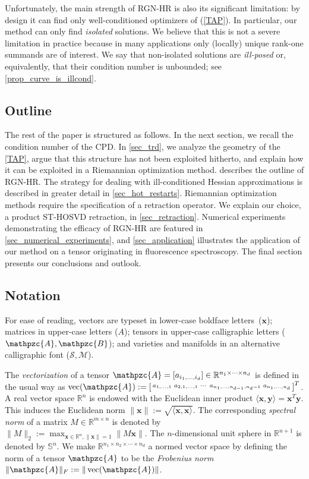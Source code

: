 \documentclass[a4paper,10pt,final]{siamart1116}
\newcommand{\Var}[1]{\mathcal{#1}}
\newcommand{\tensor}[1]{\mathpzc{#1}}
\newcommand{\vect}[1]{\mathbf{#1}}
\newcommand{\R}{\mathbb{R}}
\newcommand{\reftag}[1]{\ref{#1}}
\newcommand{\refeqn}[1]{{(\ref{#1})}}
\newcommand{\refsec}[1]{{\cref{#1}}}
\newcommand{\refprop}[1]{{\cref{#1}}}
\numberwithin{equation}{section}
\numberwithin{figure}{section}
\numberwithin{table}{section}
\numberwithin{theorem}{section}
\begin{document}
Unfortunately, the main strength of RGN-HR is also its significant limitation: by design it can find only well-conditioned optimizers of \refeqn{TAP}. In particular, our method can only find \emph{isolated} solutions. We believe that this is not a severe limitation in practice because in many applications only (locally) unique rank-one summands are of interest. We say that non-isolated solutions are \emph{ill-posed} or, equivalently, that their condition number is unbounded; {see} \refprop{prop_curve_is_illcond}.

\subsection{Outline}
The rest of the paper is structured as follows. In the next section, we recall the condition number of the CPD.
In \refsec{sec_trd}, we analyze the geometry of the \reftag{TAP}, argue that this structure has not been exploited hitherto, and explain how it can be exploited in a Riemannian optimization method.  describes the outline of RGN-HR. The strategy {for dealing with ill-conditioned Hessian approximations} is described in greater detail in \cref{sec_hot_restarts}. Riemannian optimization methods require the specification of a retraction operator. We explain our choice, a product ST-HOSVD retraction, in \cref{sec_retraction}. Numerical experiments demonstrating the efficacy of RGN-HR are featured in \refsec{sec_numerical_experiments}, and \cref{sec_application} illustrates the application of our method on a tensor originating in fluorescence spectroscopy. The final section presents our conclusions and outlook.

\subsection{Notation}
For ease of reading, vectors are typeset in lower-case boldface letters~($\vect{x}$); matrices in upper-case letters ($A$); tensors in upper-case calligraphic letters ($\tensor{A}, \tensor{B}$); and varieties and manifolds in an alternative calligraphic font ($\Var{S}, \Var{M}$).

The \emph{vectorization} of a tensor $\tensor{A} = [a_{i_1,\ldots,i_d}] \in \R^{n_1 \times \cdots \times n_d}$ is defined in the usual way as $\operatorname{vec}(\tensor{A}) := \left[\begin{smallmatrix} a_{1,\ldots,1} & a_{2,1,\ldots,1} & \cdots & a_{n_1,\ldots,n_{d-1},n_d-1} & a_{n_1,\ldots,n_d} \end{smallmatrix}\right]^T$.
A real vector space $\R^n$ is endowed with the Euclidean inner product $\langle \vect{x}, \vect{y} \rangle = \vect{x}^T \vect{y}$. This induces the Euclidean norm $\lVert \vect{x} \rVert := \sqrt{\langle \vect{x}, \vect{x} \rangle}$.
The corresponding \emph{spectral norm} of a matrix $M\in\R^{m\times n}$ is denoted by $\| M \|_2:=\max_{\vect{x}\in\R^n, \lVert \vect{x} \rVert=1} \lVert M \vect{x} \rVert.$ {The $n$-dimensional unit sphere in $\R^{n+1}$ is denoted by $\mathbb{S}^n$.} We make $\R^{n_1 \times n_2 \times \cdots \times n_d}$ a normed vector space by defining the norm of a tensor $\tensor{A}$ to be the \emph{Frobenius norm} $\lVert \tensor{A}\rVert_F := \|\operatorname{vec}(\tensor{A})\|$.
\end{document}
